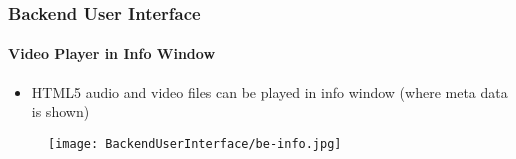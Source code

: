 
\begin{frame}[fragile]
	\frametitle{Backend User Interface}
	\framesubtitle{Video Player in Info Window}

	\begin{itemize}
		\item HTML5 audio and video files can be played in info window\newline
			(where meta data is shown)
	\end{itemize}

	\begin{figure}
		\texttt{[image: BackendUserInterface/be-info.jpg]}
	\end{figure}

\end{frame}

